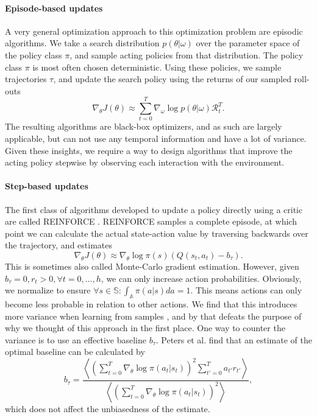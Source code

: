\documentclass[conference, final]{IEEEtran}
\begin{document}
\paragraph{Episode-based updates} 
A very general optimization approach to this optimization problem are episodic algorithms. 
We take a search distribution $p(\theta|\omega)$ over the parameter space of the policy class $\pi$, and sample acting policies from that distribution. 
The policy class $\pi$ is most often chosen deterministic. 
Using these policies, we sample trajectories $\tau$, and update the search policy using the returns of our sampled roll-outs
\begin{equation}
	\nabla_\theta J(\theta) \approx \sum_{t=0}^T \nabla_\omega \log p(\theta|\omega) \mathcal{R}_t^T.
\end{equation}
The resulting algorithms are black-box optimizers, and as such are largely applicable, but can not use any temporal information and have a lot of variance.
Given these insights, we require a way to design algorithms that improve the acting policy stepwise by observing each interaction with the environment.

\paragraph{Step-based updates}
The first class of algorithms developed to update a policy directly using a critic are called REINFORCE \cite{Williams92simplestatistical}.
REINFORCE samples a complete episode, at which point we can calculate the actual state-action value by traversing backwards over the trajectory, and estimates
\begin{equation}
	\nabla_\theta J(\theta) \approx \nabla_\theta\log\pi(s) \left(Q(s_t,a_t) - b_\tau \right).
	\label{eqn:reinforce}
\end{equation}
This is sometimes also called Monte-Carlo gradient estimation. 
However, given $b_\tau = 0, r_t > 0, \forall t=0,\dots,h$, we can only increase action probabilities. 
Obviously, we normalize to ensure $\forall s \in \mathbb{S}: \int_\mathbb{A}{\pi(a|s)da} = 1$. 
This means actions can only become less probable in relation to other actions. 
We find that this introduces more variance when learning from samples \cite{Sutton:1999:PGM:3009657.3009806}, and by that defeats the purpose of why we thought of this approach in the first place. 
One way to counter the variance is to use an effective baseline $b_\tau$.
Peters et al. \cite{4867} find that an estimate of the optimal baseline can be calculated by
\begin{equation}
	b_\tau = \frac
		{\left\langle 
			\left(\sum_{t=0}^T \nabla_\theta \log\pi(a_t|s_t) \right)^2 \sum_{t'=0}^T a_{t'} r_{t'} 
		\right\rangle}
		{\left\langle
			\left(\sum_{t=0}^T \nabla_\theta \log\pi(a_t|s_t) \right)^2
		\right\rangle},
\end{equation}
which does not affect the unbiasedness of the estimate.
\end{document}
